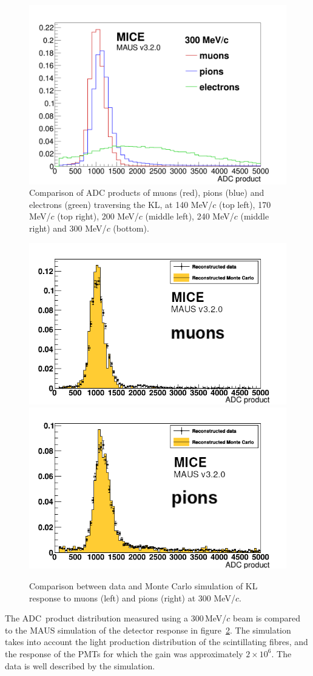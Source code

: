 \begin{figure}
\begin{center}
    \includegraphics[width=0.49\columnwidth]{./04-KL/Figures/mu_vs_pi_vs_e_300MeV.png}
  \end{center}
  \caption{
    Comparison of ADC products of muons (red), pions (blue) and electrons (green) traversing the KL, at 140
    MeV/$c$ (top left), 170 MeV/$c$ (top right), 200 MeV/$c$ (middle
    left), 240 MeV/$c$ (middle right) and 300 MeV/$c$ (bottom).
  }
  \label{fig:KL4}
\end{figure}
\begin{figure}
  \begin{center}
    \includegraphics[width=0.49\columnwidth]{./04-KL/Figures/muon_mc_vs_data_edited.png}
    \includegraphics[width=0.49\columnwidth]{./04-KL/Figures/pion_mc_vs_data_edited.png}
  \end{center}
  \caption{
    Comparison between data and Monte Carlo simulation of KL response
    to muons (left) and pions (right) at 300 MeV/$c$.
  } 
  \label{fig:KL_mc_vs_data}
\end{figure}

The ADC~product distribution measured using a 300\,MeV/$c$ beam is
compared to the MAUS simulation of the detector response in
figure~\ref{fig:KL_mc_vs_data}.
The simulation takes into account the light production distribution of the
scintillating fibres, and the response of the PMTs for which the gain was
approximately $2 \times 10^6$. 
The data is well described by the simulation.
